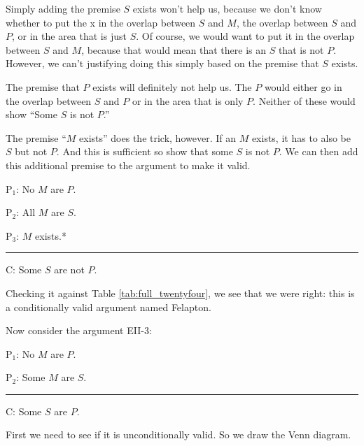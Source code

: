 Simply adding the premise $S$ exists won't help us, because we don't know whether to put the x in the overlap between $S$ and $M$, the overlap between $S$ and $P$, or in the area that is just $S$. Of course, we would want to put it in the overlap between $S$ and $M$, because that would mean that there is an $S$ that is not $P$. However, we can't justifying doing this simply based on the premise that $S$ exists. 

The premise that $P$ exists will definitely not help us. The $P$ would either go in the overlap between $S$ and $P$ or in the area that is only $P$. Neither of these would show ``Some $S$ is not $P$.''

The premise ``$M$ exists'' does the trick, however. If an $M$ exists, it has to also be $S$ but not $P$. And this is sufficient so show that some $S$ is not $P$. We can then add this additional premise to the argument to make it valid. \label{CVFex2}

\begin{earg}
\item[P$_1$:] No $M$ are $P$.
\item[P$_2$:] All $M$ are $S$.
\item[P$_3$:] $M$ exists.*
\vspace{-.5em}
\item [] \rule{0.2\linewidth}{.5pt} 
\item[C:] Some $S$ are not $P$.   
\end{earg} 

Checking it against Table \ref{tab:full_twentyfour}, we see that we were right: this is a conditionally valid argument named Felapton.

Now consider the argument EII-3:

\begin{earg} 
\item[P$_1$:] No $M$ are $P$.
\item[P$_2$:] Some $M$ are $S$.
\vspace{-.5em} 
\item [] \rule{0.2\linewidth}{.5pt} 
\item[C:] Some $S$ are $P$.
 \end{earg}

First we need to see if it is unconditionally valid. So we draw the Venn diagram. 

\begin{center}
\end{center}

